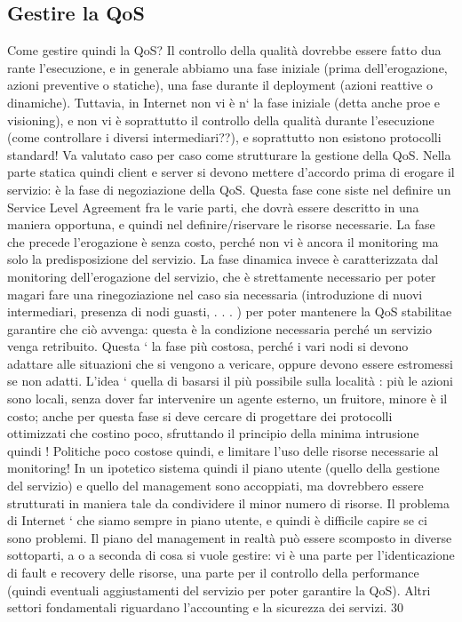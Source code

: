 \subsection{Gestire la QoS}
Come gestire quindi la QoS? Il controllo della qualità dovrebbe essere fatto dua
rante l'esecuzione, e in generale abbiamo una fase iniziale (prima dell'erogazione,
azioni preventive o statiche), una fase durante il deployment (azioni reattive o
dinamiche). Tuttavia, in Internet non vi è n` la fase iniziale (detta anche proe e
visioning), e non vi è soprattutto il controllo della qualità durante l'esecuzione
(come controllare i diversi intermediari??), e soprattutto non esistono protocolli
standard! Va valutato caso per caso come strutturare la gestione della QoS.
Nella parte statica quindi client e server si devono mettere d'accordo prima
di erogare il servizio: è la fase di negoziazione della QoS. Questa fase cone
siste nel definire un Service Level Agreement fra le varie parti, che dovrà essere
descritto in una maniera opportuna, e quindi nel definire/riservare le risorse necessarie. La fase che precede
l'erogazione è senza costo, perché non vi è ancora
il monitoring ma solo la predisposizione del servizio.
La fase dinamica invece è caratterizzata dal monitoring dell'erogazione del
servizio, che è strettamente necessario per poter magari fare una rinegoziazione
nel caso sia necessaria (introduzione di nuovi intermediari, presenza di nodi
guasti, . . . ) per poter mantenere la QoS stabilitae garantire che ciò avvenga:
questa è la condizione necessaria perché un servizio venga retribuito. Questa `
la fase più costosa, perché i vari nodi si devono adattare alle situazioni che si
vengono a vericare, oppure devono essere estromessi se non adatti. L'idea `
quella di basarsi il più possibile sulla località : più le azioni sono locali, senza
dover far intervenire un agente esterno, un fruitore, minore è il costo; anche per
questa fase si deve cercare di progettare dei protocolli ottimizzati che costino
poco, sfruttando il principio della minima intrusione quindi ! Politiche poco
costose quindi, e limitare l'uso delle risorse necessarie al monitoring! In un
ipotetico sistema quindi il piano utente (quello della gestione del servizio) e
quello del management sono accoppiati, ma dovrebbero essere strutturati in
maniera tale da condividere il minor numero di risorse. Il problema di Internet
` che siamo sempre in piano utente, e quindi è difficile capire se ci sono problemi.
Il piano del management in realtà può essere scomposto in diverse sottoparti,
a o
a seconda di cosa si vuole gestire: vi è una parte per l'identicazione di fault
e recovery delle risorse, una parte per il controllo della performance (quindi
eventuali aggiustamenti del servizio per poter garantire la QoS). Altri settori
fondamentali riguardano l'accounting e la sicurezza dei servizi.
30
